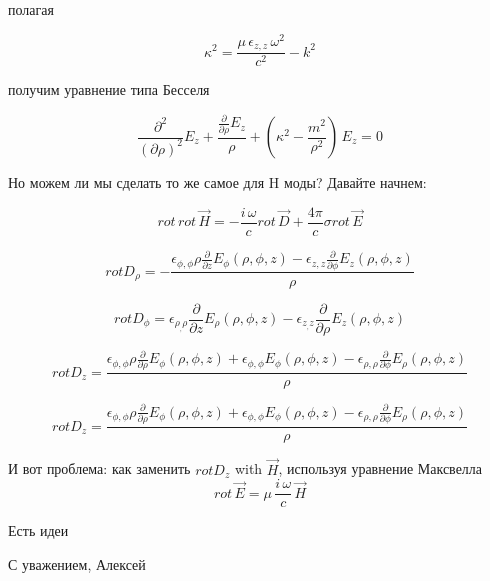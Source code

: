 \documentclass{article}
\begin{document}
полагая

$$\kappa^2 = \frac{\mu \, {\epsilon}_{z,z} \, \omega^2}{c^2} - k^2$$

получим уравнение типа Бесселя

$$\frac{\partial^{2}}{(\partial {\rho})^{2}}E_{z} + \frac{\frac{\partial}{\partial {\rho}}E_{z}}{{\rho}} + \left(\kappa^2 - \frac{m^{2}}{{\rho}^{2}}\right)\,E_{z} = 0$$


Но можем ли мы сделать то же самое для H моды?
Давайте начнем:



$$rot\,rot\,\vec{H} = - \frac{i\,\omega}{c} rot\, \vec{D}  + \frac{4\pi}{c} \sigma rot\,\vec{E}$$


$$rot D_{\rho}=-\frac{{\epsilon}_{\phi,\phi} {\rho} \frac{\partial}{\partial \mathit{z}}E_{\phi}\left({\rho}, {\phi}, \mathit{z}\right) - {\epsilon}_{z,z} \frac{\partial}{\partial {\phi}}E_{z}\left({\rho}, {\phi}, \mathit{z}\right)}{{\rho}}$$

$$rot D_{\phi}={\epsilon}_{\rho_,\rho} \frac{\partial}{\partial \mathit{z}}E_{\rho}\left({\rho}, {\phi}, \mathit{z}\right) - \epsilon_{z_,z} \frac{\partial}{\partial {\rho}}E_{z}\left({\rho}, {\phi}, \mathit{z}\right)$$

$$rot D_{z}=\frac{{\epsilon}_{\phi,\phi} {\rho} \frac{\partial}{\partial {\rho}}E_{\phi}\left({\rho}, {\phi}, \mathit{z}\right) + \epsilon_{\phi,\phi} E_{\phi}\left({\rho}, {\phi}, \mathit{z}\right) - {\epsilon}_{\rho,\rho} \frac{\partial}{\partial {\phi}}E_{\rho}\left({\rho}, {\phi}, \mathit{z}\right)}{{\rho}}$$

$$rot D_{z}=\frac{{\epsilon}_{\phi,\phi} {\rho} \frac{\partial}{\partial {\rho}}E_{\phi}\left({\rho}, {\phi}, \mathit{z}\right) + {\epsilon}_{\phi,\phi} E_{\phi}\left({\rho}, {\phi}, \mathit{z}\right) - {\epsilon}_{\rho,\rho} \frac{\partial}{\partial {\phi}}E_{\rho}\left({\rho}, {\phi}, \mathit{z}\right)}{{\rho}}$$

И вот проблема: как заменить $rot D_{z}$ with $\vec{H}$, используя уравнение Максвелла
$$rot\,\vec{E} = \mu\,\frac{i\,\omega}{c}\,\vec{H}$$

Есть идеи



С уважением, Алексей
\end{document}
